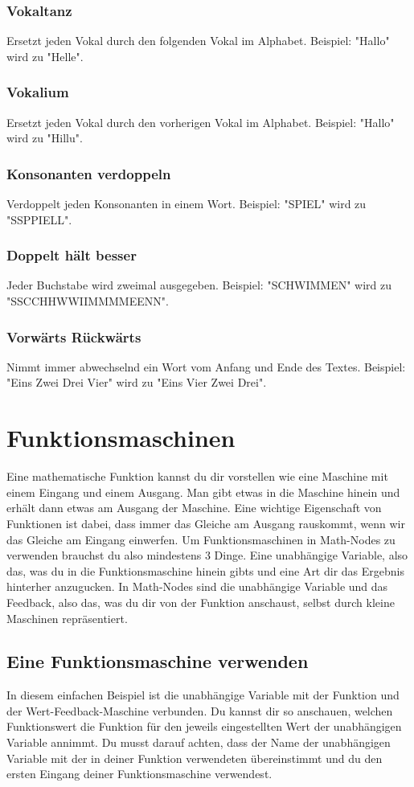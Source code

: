 \documentclass[12pt]{report}
\begin{document}
\subsubsection{Vokaltanz}
Ersetzt jeden Vokal durch den folgenden Vokal im Alphabet. Beispiel: "Hallo" wird zu "Helle".

\subsubsection{Vokalium}
Ersetzt jeden Vokal durch den vorherigen Vokal im Alphabet. Beispiel: "Hallo" wird zu "Hillu".

\subsubsection{Konsonanten verdoppeln}
Verdoppelt jeden Konsonanten in einem Wort. Beispiel: "SPIEL" wird zu "SSPPIELL".

\subsubsection{Doppelt hält besser}
Jeder Buchstabe wird zweimal ausgegeben. Beispiel: "SCHWIMMEN" wird zu "SSCCHHWWIIMMMMEENN".

\subsubsection{Vorwärts Rückwärts}
Nimmt immer abwechselnd ein Wort vom Anfang und Ende des Textes. Beispiel: "Eins Zwei Drei Vier" wird zu "Eins Vier Zwei Drei".

\section{Funktionsmaschinen}
Eine mathematische Funktion kannst du dir vorstellen wie eine Maschine mit einem Eingang und einem Ausgang. Man gibt etwas in die Maschine hinein und erhält dann etwas am Ausgang der Maschine. Eine wichtige Eigenschaft von Funktionen ist dabei, dass immer das Gleiche am Ausgang rauskommt, wenn wir das Gleiche am Eingang einwerfen. Um Funktionsmaschinen in Math-Nodes zu verwenden brauchst du also mindestens 3 Dinge. Eine unabhängige Variable, also das, was du in die Funktionsmaschine hinein gibts und eine Art dir das Ergebnis hinterher anzugucken. In Math-Nodes sind die unabhängige Variable und das Feedback, also das, was du dir von der Funktion anschaust, selbst durch kleine Maschinen repräsentiert. 
\subsection{Eine Funktionsmaschine verwenden}
In diesem einfachen Beispiel ist die unabhängige Variable mit der Funktion und der Wert-Feedback-Maschine verbunden. Du kannst dir so anschauen, welchen Funktionswert die Funktion für den jeweils eingestellten Wert der unabhängigen Variable annimmt. Du musst darauf achten, dass der Name der unabhängigen Variable mit der in deiner Funktion verwendeten übereinstimmt und du den ersten Eingang deiner Funktionsmaschine verwendest. 
\end{document}
